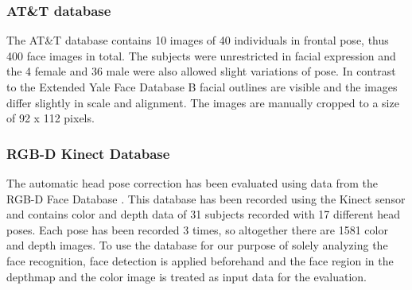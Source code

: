 \subsubsection{AT\&T database}
The AT\&T database contains 10 images of 40 individuals in frontal pose, thus 400 face images in total.
The subjects were unrestricted in facial expression and the 4 female and 36 male were also allowed slight variations of pose.
In contrast to the Extended Yale Face Database B facial outlines are visible and the images differ slightly in scale and alignment.
The images are manually cropped to a size of 92 x 112 pixels.

\subsubsection{RGB-D Kinect Database}
The automatic head pose correction has been evaluated using data from the RGB-D Face Database \cite{Jasek2012}.
This database has been recorded using the Kinect sensor and contains color and depth data of 31 subjects recorded with 17 different head poses.
Each pose has been recorded 3 times, so altogether there are 1581 color and depth images.
To use the database for our purpose of solely analyzing the face recognition, face detection is applied beforehand and the face region in the depthmap and the color image is treated as input data for the evaluation.

